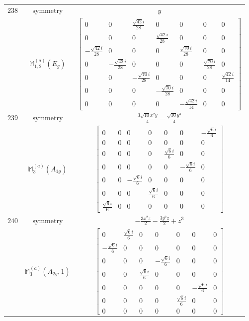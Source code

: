 \documentclass[fleqn,8pt,landscape]{jsarticle}
\begin{document}
\begin{longtable}{ccc}
$ 238 $ & $ \text{symmetry} $ & $ y $ \\
$  $ & $ \mathbb{M}_{1,2}^{(a)}(E_{g}) $ & $ \begin{bmatrix} 0 & 0 & \frac{\sqrt{42} i}{28} & 0 & 0 & 0 & 0 \\ 0 & 0 & 0 & \frac{\sqrt{42} i}{28} & 0 & 0 & 0 \\ - \frac{\sqrt{42} i}{28} & 0 & 0 & 0 & \frac{\sqrt{70} i}{28} & 0 & 0 \\ 0 & - \frac{\sqrt{42} i}{28} & 0 & 0 & 0 & \frac{\sqrt{70} i}{28} & 0 \\ 0 & 0 & - \frac{\sqrt{70} i}{28} & 0 & 0 & 0 & \frac{\sqrt{42} i}{14} \\ 0 & 0 & 0 & - \frac{\sqrt{70} i}{28} & 0 & 0 & 0 \\ 0 & 0 & 0 & 0 & - \frac{\sqrt{42} i}{14} & 0 & 0 \end{bmatrix} $ \\ \hline
$ 239 $ & $ \text{symmetry} $ & $ \frac{3 \sqrt{10} x^{2} y}{4} - \frac{\sqrt{10} y^{3}}{4} $ \\
$  $ & $ \mathbb{M}_{3}^{(a)}(A_{1g}) $ & $ \begin{bmatrix} 0 & 0 & 0 & 0 & 0 & 0 & - \frac{\sqrt{6} i}{6} \\ 0 & 0 & 0 & 0 & 0 & 0 & 0 \\ 0 & 0 & 0 & 0 & \frac{\sqrt{6} i}{6} & 0 & 0 \\ 0 & 0 & 0 & 0 & 0 & - \frac{\sqrt{6} i}{6} & 0 \\ 0 & 0 & - \frac{\sqrt{6} i}{6} & 0 & 0 & 0 & 0 \\ 0 & 0 & 0 & \frac{\sqrt{6} i}{6} & 0 & 0 & 0 \\ \frac{\sqrt{6} i}{6} & 0 & 0 & 0 & 0 & 0 & 0 \end{bmatrix} $ \\ \hline
$ 240 $ & $ \text{symmetry} $ & $ - \frac{3 x^{2} z}{2} - \frac{3 y^{2} z}{2} + z^{3} $ \\
$  $ & $ \mathbb{M}_{3}^{(a)}(A_{2g},1) $ & $ \begin{bmatrix} 0 & \frac{\sqrt{6} i}{6} & 0 & 0 & 0 & 0 & 0 \\ - \frac{\sqrt{6} i}{6} & 0 & 0 & 0 & 0 & 0 & 0 \\ 0 & 0 & 0 & - \frac{\sqrt{6} i}{6} & 0 & 0 & 0 \\ 0 & 0 & \frac{\sqrt{6} i}{6} & 0 & 0 & 0 & 0 \\ 0 & 0 & 0 & 0 & 0 & - \frac{\sqrt{6} i}{6} & 0 \\ 0 & 0 & 0 & 0 & \frac{\sqrt{6} i}{6} & 0 & 0 \\ 0 & 0 & 0 & 0 & 0 & 0 & 0 \end{bmatrix} $ \\ \hline

\end{longtable}
\end{document}
